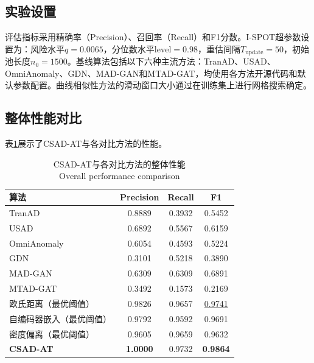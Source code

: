 \documentclass[10.5pt,a4paper,twocolumn]{ctexart}
\newcommand{\bicaption}[2]{%
  \caption{#1\\{\small #2}}%
}
\begin{document}
\subsection{实验设置}

评估指标采用精确率（Precision）、召回率（Recall）和F1分数。I-SPOT超参数设置为：风险水平$q = 0.0065$，分位数水平$\text{level} = 0.98$，重估间隔$T_{\text{update}} = 50$，初始池长度$n_0 = 1500$。基线算法包括以下六种主流方法：TranAD\cite{tuli2022tranad}、USAD\cite{audibert2020usad}、OmniAnomaly\cite{su2019omni}、GDN\cite{deng2021graph}、MAD-GAN\cite{li2019madgan}和MTAD-GAT\cite{zhao2020mtadgat}，均使用各方法开源代码和默认参数配置。曲线相似性方法的滑动窗口大小通过在训练集上进行网格搜索确定。

\subsection{整体性能对比}

表\ref{tab:overall_results}展示了CSAD-AT与各对比方法的性能。

\begin{table}[htbp]
    \centering
    \bicaption{CSAD-AT与各对比方法的整体性能}{Overall performance comparison}
    \label{tab:overall_results}
    \begin{tabular}{lccc}
        \toprule
        算法 & Precision & Recall & F1 \\
        \midrule
        TranAD\cite{tuli2022tranad}      & 0.8889 & 0.3932 & 0.5452 \\
        USAD\cite{audibert2020usad}       & 0.6892 & 0.5567 & 0.6159 \\
        OmniAnomaly\cite{su2019omni}      & 0.6054 & 0.4593 & 0.5224 \\
        GDN\cite{deng2021graph}           & 0.3101 & 0.5218 & 0.3890 \\
        MAD-GAN\cite{li2019madgan}        & 0.6309 & 0.6309 & 0.6891 \\
        MTAD-GAT\cite{zhao2020mtadgat}    & 0.3492 & 0.1573 & 0.2169 \\
        \midrule
        欧氏距离（最优阈值）     & 0.9826 & 0.9657 & \underline{0.9741} \\
        自编码器嵌入（最优阈值） & 0.9792 & 0.9592 & 0.9691 \\
        密度偏离（最优阈值）     & 0.9605 & 0.9659 & 0.9632 \\
        \midrule
        \textbf{CSAD-AT}        & \textbf{1.0000} & 0.9732 & \textbf{0.9864} \\
        \bottomrule
    \end{tabular}
\end{table}
\end{document}

